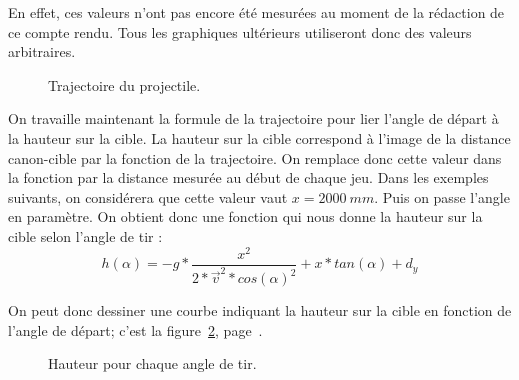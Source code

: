 En effet, ces valeurs n'ont pas encore été mesurées au moment de la rédaction de ce compte rendu. Tous les graphiques ultérieurs utiliseront donc des valeurs arbitraires.

\begin{figure}
	\begin{center}
	\end{center}
	\caption{Trajectoire du projectile.}
	\label{crb_traj}
\end{figure}

On travaille maintenant la formule de la trajectoire pour lier l'angle de départ à la hauteur sur la cible. La hauteur sur la cible correspond à l'image de la distance canon-cible par la fonction de la trajectoire. On remplace donc cette valeur dans la fonction par la distance mesurée au début de chaque jeu. Dans les exemples suivants, on considérera que cette valeur vaut $x = 2000\ mm$. Puis on passe l'angle en paramètre. On obtient donc une fonction qui nous donne la hauteur sur la cible selon l'angle de tir :\begin{equation}
	h(\alpha) = -g*\frac{x^2}{2*\overrightarrow{v}^2*cos(\alpha)^2} + x*tan(\alpha) +d_y
\end{equation}

On peut donc dessiner une courbe indiquant la hauteur sur la cible en fonction de l'angle de départ; c'est la figure~\ref{crb_angle}, page~\pageref{crb_angle}.

\begin{figure}
	\begin{center}
	\end{center}
	\caption{Hauteur pour chaque angle de tir.}
	\label{crb_angle}
\end{figure}

